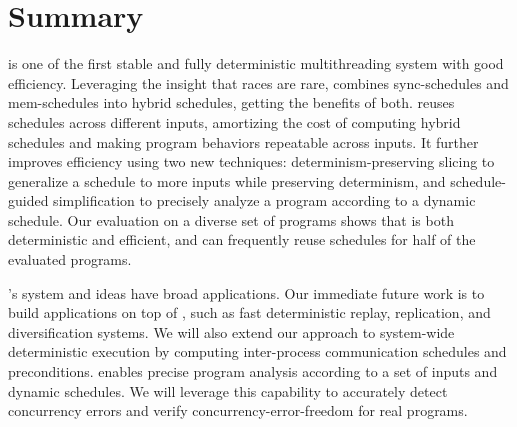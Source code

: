 \section{Summary} \label{sec:peregrine-summary}

\peregrine is one of the first stable and fully deterministic multithreading 
system with good efficiency. Leveraging the insight that races are rare, 
\peregrine combines sync-schedules
and mem-schedules into hybrid schedules, getting the benefits of both.
\peregrine reuses schedules across different inputs, amortizing the cost of
computing hybrid schedules and making program behaviors repeatable
across inputs.  It further improves
efficiency using two new techniques: determinism-preserving slicing to
generalize a schedule to more inputs while preserving determinism, and
schedule-guided simplification to precisely analyze a program according
to a dynamic schedule.  Our evaluation on a diverse set of programs
shows that \peregrine is both deterministic and efficient, and can frequently
reuse schedules for half of the evaluated programs.


\peregrine's system and ideas have broad applications.  Our immediate future
work is to build applications on top of \peregrine, such as fast deterministic
replay, replication, and diversification systems.  We will also extend our
approach to system-wide deterministic execution by computing inter-process
communication schedules and preconditions.  \peregrine enables precise program
analysis according to a set of inputs and dynamic schedules.  We will
leverage this capability to accurately detect concurrency errors and
verify concurrency-error-freedom for real programs.

